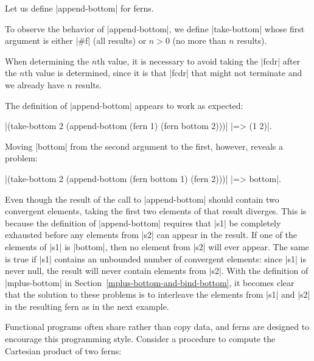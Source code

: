 
\noindent
Let us define \scheme|append-bottom| for ferns. 

\schemedisplayspace
{}

\noindent
To observe the behavior of \scheme|append-bottom|, we define \scheme|take-bottom| whose
first argument is either \scheme|#f| (all results) or $n > 0$ (no more than $n$ results).

\schemedisplayspace
{}

\noindent 
When determining the $n$th value, it is necessary to avoid taking the
\scheme|fcdr| after the $n$th value is determined, since it is that \scheme|fcdr|
that might not terminate and we already have $n$ results.

The definition of \scheme|append-bottom| appears to work as expected:

\wspace
\noindent
\scheme|(take-bottom 2 (append-bottom (fern 1) (fern bottom 2)))| \schemeresult|=> (1 2)|.
\wspace

\noindent Moving \scheme|bottom| from the second argument to the
first, however, reveals a problem:

\wspace
\noindent
\scheme|(take-bottom 2 (append-bottom (fern bottom 1) (fern 2)))| \schemeresult|=> bottom|.
\wspace

\noindent
Even though the result of the call to
\scheme|append-bottom| should contain two convergent elements, taking the first
two elements of that result diverges. This is because the
definition of \scheme|append-bottom| requires that \scheme|s1| be completely
exhausted before any elements from \scheme|s2| can appear in the result.
If one of the elements of \scheme|s1| is \scheme|bottom|, then no
element from \scheme|s2| will ever appear.  The same is true if
\scheme|s1| contains an unbounded number of convergent elements: since
\scheme|s1| is never null, the result will never contain elements from
\scheme|s2|.  With the definition of \scheme|mplus-bottom| in
Section~\ref{mplus-bottom-and-bind-bottom}, it becomes clear that the solution to these problems is to
interleave the elements from \scheme|s1| and \scheme|s2| in the
resulting fern as in the next example.

Functional programs often share rather than copy data, and ferns are
designed to encourage this programming style. Consider a procedure to
compute the Cartesian product of two ferns:

\schemedisplayspace
{}

